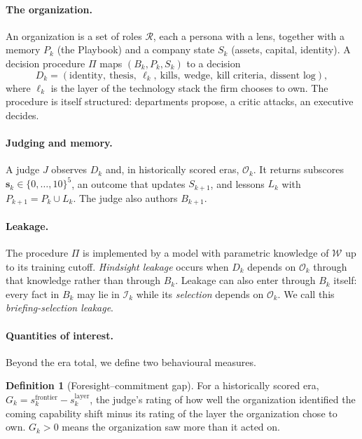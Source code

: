 \documentclass[11pt]{article}
\theoremstyle{definition}
\newtheorem{definition}{Definition}
\begin{document}
\paragraph{The organization.} An organization is a set of roles $\mathcal{R}$, each a persona with a lens, together with a memory $P_k$ (the Playbook) and a company state $S_k$ (assets, capital, identity). A decision procedure $\Pi$ maps $(B_k,P_k,S_k)$ to a decision
\begin{equation}
D_k=(\text{identity},\ \text{thesis},\ \ell_k,\ \text{kills},\ \text{wedge},\ \text{kill criteria},\ \text{dissent log}),
\end{equation}
where $\ell_k$ is the layer of the technology stack the firm chooses to own. The procedure is itself structured: departments propose, a critic attacks, an executive decides.

\paragraph{Judging and memory.} A judge $J$ observes $D_k$ and, in historically scored eras, $\mathcal{O}_k$. It returns subscores $\mathbf{s}_k\in\{0,\dots,10\}^5$, an outcome that updates $S_{k+1}$, and lessons $L_k$ with $P_{k+1}=P_k\cup L_k$. The judge also authors $B_{k+1}$.

\paragraph{Leakage.} The procedure $\Pi$ is implemented by a model with parametric knowledge of $\mathcal{W}$ up to its training cutoff. \emph{Hindsight leakage} occurs when $D_k$ depends on $\mathcal{O}_k$ through that knowledge rather than through $B_k$. Leakage can also enter through $B_k$ itself: every fact in $B_k$ may lie in $\mathcal{I}_k$ while its \emph{selection} depends on $\mathcal{O}_k$. We call this \emph{briefing-selection leakage}.

\paragraph{Quantities of interest.} Beyond the era total, we define two behavioural measures.

\begin{definition}[Foresight--commitment gap]
For a historically scored era, $G_k=s_k^{\text{frontier}}-s_k^{\text{layer}}$, the judge's rating of how well the organization identified the coming capability shift minus its rating of the layer the organization chose to own. $G_k>0$ means the organization saw more than it acted on.
\end{definition}
\end{document}
